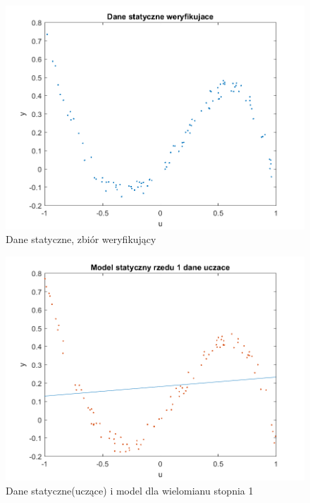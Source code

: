 \documentclass{article}
\begin{document}
\begin{figure}
\centering
\includegraphics[width=0.95\linewidth]{../dane_statyczne/dane_statyczne_weryf}
\caption{Dane statyczne, zbiór weryfikujący}
\label{fig:danestatyczneweryf}
\end{figure}

\begin{figure}
\centering
\includegraphics[width=0.95\linewidth]{../dane_statyczne/dane_statyczne_model_rzedu_1_uczace}
\caption{Dane statyczne(uczące) i model dla wielomianu stopnia 1}
\label{fig:danestatyczneuczace1}
\end{figure}
\end{document}
